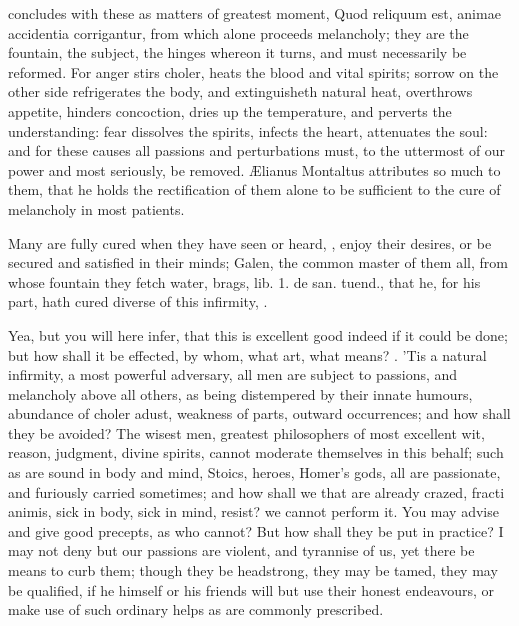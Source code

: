 {concludes with these as matters of greatest moment, Quod reliquum est,
animae accidentia corrigantur, from which alone proceeds melancholy;
they are the fountain, the subject, the hinges whereon it turns, and
must necessarily be reformed. For anger stirs choler, heats the
blood and vital spirits; sorrow on the other side refrigerates the
body, and extinguisheth natural heat, overthrows appetite, hinders
concoction, dries up the temperature, and perverts the understanding:
fear dissolves the spirits, infects the heart, attenuates the soul: and
for these causes all passions and perturbations must, to the uttermost
of our power and most seriously, be removed. \AE{}lianus Montaltus
attributes so much to them, that he holds the rectification of
them alone to be sufficient to the cure of melancholy in most patients.

Many are fully cured when they have seen or heard, \etc{}, enjoy their
desires, or be secured and satisfied in their minds; Galen, the common
master of them all, from whose fountain they fetch water, brags, lib.
1. de san. tuend., that he, for his part, hath cured diverse of this
infirmity, .

Yea, but you will here infer, that this is excellent good indeed if it
could be done; but how shall it be effected, by whom, what art, what
means? . 'Tis a natural infirmity, a most
powerful adversary, all men are subject to passions, and melancholy
above all others, as being distempered by their innate humours,
abundance of choler adust, weakness of parts, outward occurrences; and
how shall they be avoided? The wisest men, greatest philosophers of
most excellent wit, reason, judgment, divine spirits, cannot moderate
themselves in this behalf; such as are sound in body and mind, Stoics,
heroes, Homer's gods, all are passionate, and furiously carried
sometimes; and how shall we that are already crazed, fracti animis,
sick in body, sick in mind, resist? we cannot perform it. You may
advise and give good precepts, as who cannot? But how shall they be put
in practice? I may not deny but our passions are violent, and tyrannise
of us, yet there be means to curb them; though they be headstrong, they
may be tamed, they may be qualified, if he himself or his friends will
but use their honest endeavours, or make use of such ordinary helps as
are commonly prescribed.

}
